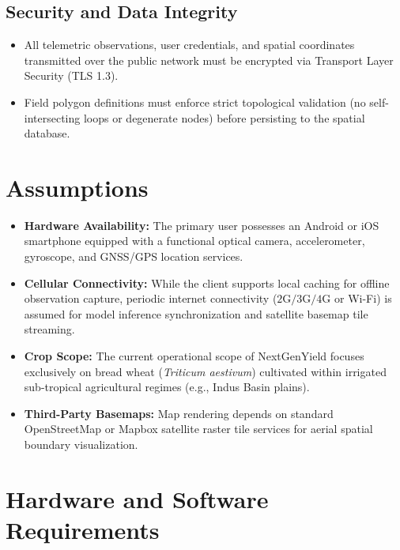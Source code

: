 \documentclass{FastFyp}
\begin{document}
\subsection{Security and Data Integrity}
\begin{itemize}
    \item All telemetric observations, user credentials, and spatial coordinates transmitted over the public network must be encrypted via Transport Layer Security (TLS 1.3).
    \item Field polygon definitions must enforce strict topological validation (no self-intersecting loops or degenerate nodes) before persisting to the spatial database.
\end{itemize}

\section{Assumptions}
\begin{itemize}
    \item \textbf{Hardware Availability:} The primary user possesses an Android or iOS smartphone equipped with a functional optical camera, accelerometer, gyroscope, and GNSS/GPS location services.
    \item \textbf{Cellular Connectivity:} While the client supports local caching for offline observation capture, periodic internet connectivity ($2\text{G}/3\text{G}/4\text{G}$ or Wi-Fi) is assumed for model inference synchronization and satellite basemap tile streaming.
    \item \textbf{Crop Scope:} The current operational scope of NextGenYield focuses exclusively on bread wheat (\textit{Triticum aestivum}) cultivated within irrigated sub-tropical agricultural regimes (e.g., Indus Basin plains).
    \item \textbf{Third-Party Basemaps:} Map rendering depends on standard OpenStreetMap or Mapbox satellite raster tile services for aerial spatial boundary visualization.
\end{itemize}

\section{Hardware and Software Requirements}
\end{document}
